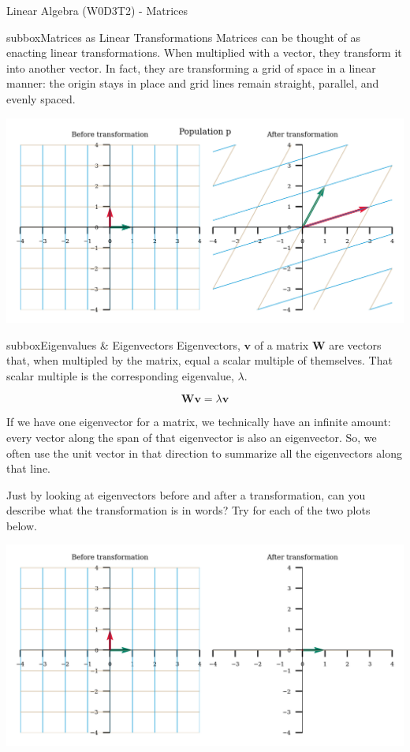 \begin{textbox}{Linear Algebra (W0D3T2) - Matrices}

\begin{subbox}{subbox}{Matrices as Linear Transformations}
\scriptsize
Matrices can be thought of as enacting linear transformations. When multiplied with a vector, they transform it into another vector. In fact, they are transforming a grid of space in a linear manner: the origin stays in place and grid lines remain straight, parallel, and evenly spaced.

\centering
\includegraphics[scale=0.5]{Figures/PreCourse/Figure4.png}
\end{subbox}


\begin{subbox}{subbox}{Eigenvalues \& Eigenvectors}
\tiny
Eigenvectors, $\mathbf{v}$ of a matrix $\mathbf{W}$ are vectors that, when multipled by the matrix, equal a scalar multiple of themselves. That scalar multiple is the corresponding eigenvalue, $\lambda$.

\begin{equation}
\mathbf{W}\mathbf{v} = \lambda\mathbf{v}
\end{equation}

If we have one eigenvector for a matrix, we technically have an infinite amount: every vector along the span of that eigenvector is also an eigenvector. So, we often use the unit vector in that direction to summarize all the eigenvectors along that line. 

Just by looking at eigenvectors before and after a transformation, can you describe what the transformation is in words? Try for each of the two plots below.

\centering
\includegraphics[scale=0.1]{Figures/PreCourse/Figure5.png}


\end{subbox}
\end{textbox}
